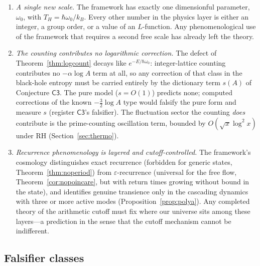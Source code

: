 \documentclass[11pt,a4paper]{article}
\theoremstyle{plain}
\theoremstyle{definition}
\theoremstyle{remark}
\begin{document}
\begin{enumerate}[leftmargin=1.6em]
uncertainties are two orders of magnitude coarser than the calibrated one and its values
are Standard-Model-coupled evaluations: the anomaly is recorded as flagged, not
confirmed, with the recovery power $0/100$ and a post-hoc bootstrap diagnostic ($3.5\%$)
documented alongside it. Precision, not machinery, is what the dictionary now waits on.
\item \emph{A single new scale.} The framework has exactly one dimensionful parameter,
$\omega_{0}$, with $T_{H}=\hbar\omega_{0}/k_{B}$. Every other number in the physics layer
is either an integer, a group order, or a value of an $L$-function. Any phenomenological
use of the framework that requires a second free scale has already left the theory.
\item \emph{The counting contributes no logarithmic correction.} The defect of
Theorem~\ref{thm:logcount} decays like $e^{-E/\hbar\omega_{0}}$: integer-lattice counting
contributes no $-\alpha\log A$ term at all, so any correction of that class in the
black-hole entropy must be carried entirely by the dictionary term $s(A)$ of Conjecture
$\mathsf{C3}$. The pure model ($s=O(1)$) predicts none; computed corrections of the known
$-\tfrac32\log A$ type would falsify the pure form and measure $s$
(register $\mathsf{C3}$'s falsifier). The fluctuation sector the counting \emph{does}
contribute is the prime-counting oscillation term, bounded by $O(\sqrt{x}\log^{2}x)$ under
RH (Section~\ref{sec:thermo}).
\item \emph{Recurrence phenomenology is layered and cutoff-controlled.} The framework's
cosmology distinguishes exact recurrence (forbidden for generic states,
Theorem~\ref{thm:noperiod}) from $\varepsilon$-recurrence (universal for the free flow,
Theorem~\ref{cor:nopoincare}, but with return times growing without bound in the state),
and identifies genuine transience only in the cascading dynamics with three or more active
modes (Proposition~\ref{prop:polya}). Any completed theory of the arithmetic cutoff must
fix where our universe sits among these layers---a prediction in the sense that the cutoff
mechanism cannot be indifferent.
\end{enumerate}

\subsection{Falsifier classes}\label{sec:classes}
\end{document}
